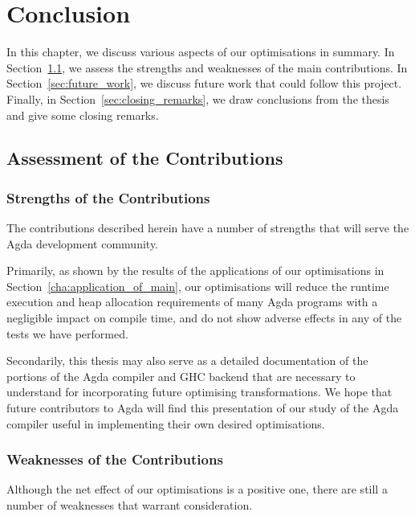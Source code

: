 \chapter{Conclusion}
\label{cha:conclusion}

In this chapter, we discuss various aspects of our optimisations in summary. In Section~\ref{sec:assessment_of_the_contributions}, we assess the strengths and weaknesses of the main contributions. In Section~\ref{sec:future_work}, we discuss future work that could follow this project. Finally, in Section~\ref{sec:closing_remarks}, we draw conclusions from the thesis and give some closing remarks.

\section{Assessment of the Contributions}
\label{sec:assessment_of_the_contributions}

\subsection{Strengths of the Contributions}
\label{sub:strengths_of_the_contributions}

The contributions described herein have a number of strengths that will serve the Agda development community.

Primarily, as shown by the results of the applications of our optimisations in Section~\ref{cha:application_of_main}, our optimisations will reduce the runtime execution and heap allocation requirements of many Agda programs with a negligible impact on compile time, and do not show adverse effects in any of the tests we have performed.

Secondarily, this thesis may also serve as a detailed documentation of the portions of the Agda compiler and GHC backend that are necessary to understand for incorporating future optimising transformations. We hope that future contributors to Agda will find this presentation of our study of the Agda compiler useful in implementing their own desired optimisations.

\subsection{Weaknesses of the Contributions}
\label{sub:weaknesses_of_the_contributions}

Although the net effect of our optimisations is a positive one, there are still a number of weaknesses that warrant consideration.

